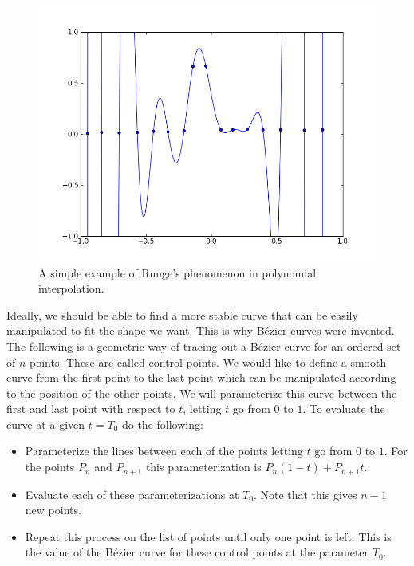 \begin{figure}
\includegraphics[width=.9\textwidth]{bad_interpolation2}
\caption{A simple example of Runge's phenomenon in polynomial interpolation.}
\label{bezier:bad_interpolation2}
\end{figure}

Ideally, we should be able to find a more stable curve that can be easily manipulated to fit the shape we want.
This is why B\'{e}zier curves were invented.
The following is a geometric way of tracing out a B\'{e}zier curve for an ordered set of $n$ points.
These are called control points.
We would like to define a smooth curve from the first point to the last point which can be manipulated according to the position of the other points.
We will parameterize this curve between the first and last point with respect to $t$, letting $t$ go from $0$ to $1$.
To evaluate the curve at a given $t=T_0$ do the following:
\begin{itemize}

\item

Parameterize the lines between each of the points letting $t$ go from $0$ to $1$.
For the points $P_{n}$ and $P_{n+1}$ this parameterization is $P_{n} (1-t) + P_{n+1} t$.

\item

Evaluate each of these parameterizations at $T_0$.
Note that this gives $n-1$ new points.

\item

Repeat this process on the list of points until only one point is left.
This is the value of the B\'{e}zier curve for these control points at the parameter $T_0$.

\end{itemize}

